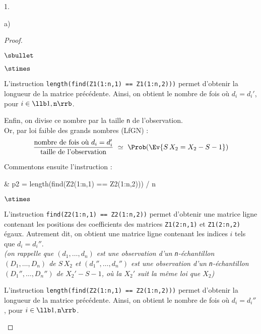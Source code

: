 \documentclass[11pt]{article}%
\begin{document}
\begin{noliste}{1.}
\begin{noliste}{a)}
\begin{proof}
\begin{noliste}{$\sbullet$}
\begin{noliste}{$\stimes$}
        \item L'instruction {\tt length(find(Z1(1:n,1) == Z1(1:n,2)))}
          permet d'obtenir la longueur de la matrice
          précédente. Ainsi, on obtient le nombre de fois où $d_i =
          d_i'$, pour $i \in \llb 1,{\tt n} \rrb$.
          
        \item Enfin, on divise ce nombre par la taille {\tt n} de
          l'observation.\\
          Or, par loi faible des grands nombres (LfGN) :
          \[
            \dfrac{\text{nombre de fois où $d_i = d_i'$}}{\text{taille
                de l'observation}} \ \simeq \ \Prob(\Ev{S \, X_2 = X_2
              - S-1})
          \]
        \end{noliste}
        
      \item Commentons ensuite l'instruction :
        \begin{scilabC}{7}
          & p2 = length(find(Z2(1:n,1) == Z2(1:n,2))) / n
        \end{scilabC}
        \begin{noliste}{$\stimes$}
        \item L'instruction {\tt find(Z2(1:n,1) == Z2(1:n,2))} permet
          d'obtenir une matrice ligne contenant les positions des
          coefficients des matrices {\tt Z1(2:n,1)} et {\tt Z1(2:n,2)}
          égaux. Autrement dit, on obtient une matrice ligne contenant
          les indices $i$ tels que $d_i = d_i''$.\\
          {\it (on rappelle que $(d_1, \ldots, d_n)$ est une
            observation d'un {\tt n}-échantillon $(D_1, \ldots, D_n)$
            de $S \, X_2$ et $(d_1'', \ldots, d_n'')$ est une
            observation d'un {\tt n}-échantillon $(D_1'', \ldots, D_n'')$
            de $X_2' - S-1$, où la \var $X_2'$ suit la même loi que $X_2$)}
          
        \item L'instruction {\tt length(find(Z2(1:n,1) == Z2(1:n,2)))}
          permet d'obtenir la longueur de la matrice
          précédente. Ainsi, on obtient le nombre de fois où $d_i =
          d_i''$, pour $i \in \llb 1,{\tt n} \rrb$.

          
          \newpage
          

\end{noliste}
\end{noliste}
\end{proof}
\end{noliste}
\end{noliste}
\end{document}
